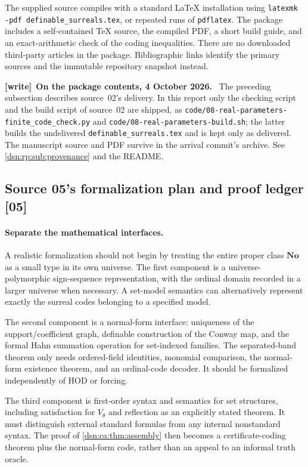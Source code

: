 \documentclass[11pt,a4paper]{article}
\numberwithin{equation}{section}
\theoremstyle{definition}
\theoremstyle{remark}
\newcommand{\No}{\mathbf{No}}
\newcommand{\src}[1]{\textup{\textsf{\small[#1]}}}
\newcommand{\fn}[1]{\nolinkurl{#1}}
\newenvironment{writenote}[1][]{\par\medskip\begingroup\small\noindent\textbf{[write]}\if\relax\detokenize{#1}\relax\else~\textbf{#1.}\fi~\ignorespaces}{\par\endgroup\medskip}
\begin{document}
The supplied source compiles with a standard LaTeX installation using
\texttt{latexmk -pdf definable\_surreals.tex}, or repeated runs of
\texttt{pdflatex}. The package includes a self-contained TeX source, the
compiled PDF, a short build guide, and an exact-arithmetic check of the
coding inequalities. There are no downloaded third-party articles in
the package. Bibliographic links identify the primary sources and the
immutable repository snapshot instead.


\begin{writenote}[On the package contents, 4 October 2026]
The preceding subsection describes source~02's delivery. In this report only
the checking script and the build script of source~02 are shipped, as
\fn{code/08-real-parameters-finite_code_check.py} and
\fn{code/08-real-parameters-build.sh}; the latter builds the undelivered
\fn{definable_surreals.tex} and is kept only as delivered. The manuscript
source and PDF survive in the arrival commit's archive. See
\cref{dsn:rp:sub:provenance} and the README.
\end{writenote}

\subsection{Source 05's formalization plan and proof ledger \src{05}}
\label{dsn:ca:sec:formalization}

\paragraph{Separate the mathematical interfaces.}
A realistic formalization should not begin by treating the entire
proper class $\No$ as a small type in its own universe. The first
component is a universe-polymorphic sign-sequence representation,
with the ordinal domain recorded in a larger universe when necessary.
A set-model semantics can alternatively represent exactly the
surreal codes belonging to a specified model.

The second component is a normal-form interface: uniqueness of the
support/coefficient graph, definable construction of the Conway map,
and the formal Hahn summation operation for set-indexed families.
The separated-band theorem only needs ordered-field identities,
monomial comparison, the normal-form existence theorem, and an
ordinal-code decoder. It should be formalized independently of HOD
or forcing.

The third component is first-order syntax and semantics for set
structures, including satisfaction for $V_\theta$ and reflection
as an explicitly stated theorem. It must distinguish external standard
formulas from any internal nonstandard syntax. The proof of
\cref{dsn:ca:thm:assembly} then becomes a certificate-coding theorem plus the
normal-form code, rather than an appeal to an informal truth oracle.
\end{document}

